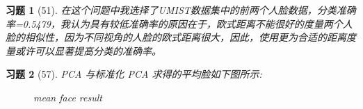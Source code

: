 \documentclass[a4paper, UTF8]{ctexart}
\newtheorem*{exercise}{\textbf{习题}}
\begin{document}
  \begin{exercise}[51]
    在这个问题中我选择了UMIST数据集中的前两个人脸数据，分类准确率=\rm{0.5479}，我认为具有较低准确率的原因在于，欧式距离不能很好的度量两个人脸的相似性，因为不同视角的人脸的欧式距离很大，因此，使用更为合适的距离度量或许可以显著提高分类的准确率。
  \end{exercise}
  \begin{exercise}[57]
    \rm{PCA} 与标准化 \rm{PCA} 求得的平均脸如下图所示:
    \begin{figure}[htbp!]
      \centering
      \caption{mean face result}
    \end{figure}
  \end{exercise}
\end{document}
